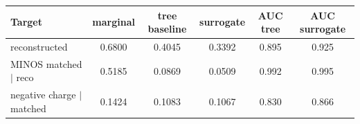 \begin{tabular}{lccccc}
\toprule
Target & marginal & tree baseline & surrogate & AUC tree & AUC surrogate \\
\midrule
reconstructed & 0.6800 & 0.4045 & 0.3392 & 0.895 & 0.925 \\
MINOS matched $\mid$ reco & 0.5185 & 0.0869 & 0.0509 & 0.992 & 0.995 \\
negative charge $\mid$ matched & 0.1424 & 0.1083 & 0.1067 & 0.830 & 0.866 \\
\bottomrule
\end{tabular}
